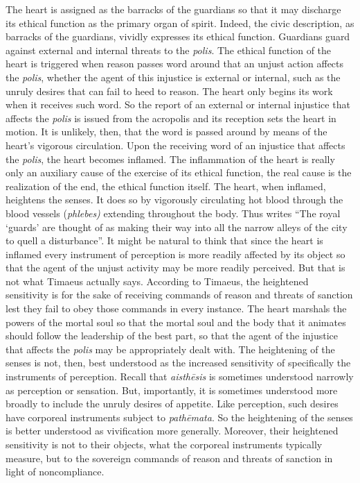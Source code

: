 The heart is assigned as the barracks of the guardians so that it may discharge its ethical function as the primary organ of spirit. Indeed, the civic description, as barracks of the guardians, vividly expresses its ethical function. Guardians guard against external and internal threats to the \emph{polis}. The ethical function of the heart is triggered when reason passes word around that an unjust action affects the \emph{polis}, whether the agent of this injustice is external or internal, such as the unruly desires that can fail to heed to reason. The heart only begins its work when it receives such word. So the report of an external or internal injustice that affects the \emph{polis} is issued from the acropolis and its reception sets the heart in motion. It is unlikely, then, that the word is passed around by means of the heart's vigorous circulation. Upon the receiving word of an injustice that affects the \emph{polis}, the heart becomes inflamed. The inflammation of the heart is really only an auxiliary cause of the exercise of its ethical function, the real cause is the realization of the end, the ethical function itself. The heart, when inflamed, heightens the senses. It does so by vigorously circulating hot blood through the blood vessels (\emph{phlebes)} extending throughout the body. Thus \citet[503]{Taylor:1928qb} writes ``The royal `guards' are thought of as making their way into all the narrow alleys of the city to quell a disturbance''. It might be natural to think that since the heart is inflamed every instrument of perception is more readily affected by its object so that the agent of the unjust activity may be more readily perceived. But that is not what Timaeus actually says. According to Timaeus, the heightened sensitivity is for the sake of receiving commands of reason and threats of sanction lest they fail to obey those commands in every instance. The heart marshals the powers of the mortal soul so that the mortal soul and the body that it animates should follow the leadership of the best part, so that the agent of the injustice that affects the \emph{polis} may be appropriately dealt with. The heightening of the senses is not, then, best understood as the increased sensitivity of specifically the instruments of perception. Recall that \emph{aisthēsis} is sometimes understood narrowly as perception or sensation. But, importantly, it is sometimes understood more broadly to include the unruly desires of appetite. Like perception, such desires have corporeal instruments subject to \emph{pathēmata}. So the heightening of the senses is better understood as vivification more generally. Moreover, their heightened sensitivity is not to their objects, what the corporeal instruments typically measure, but to the sovereign commands of reason and threats of sanction in light of noncompliance. 

